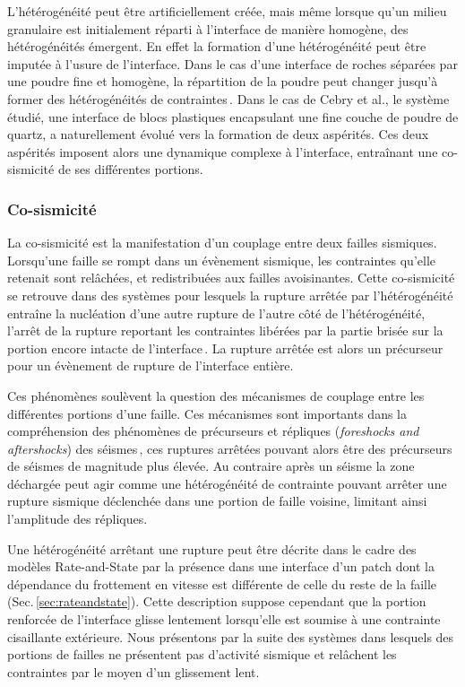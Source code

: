 L'hétérogénéité peut être artificiellement créée, mais même lorsque qu'un milieu granulaire est initialement réparti à l'interface de manière homogène, des hétérogénéités émergent. En effet la formation d'une hétérogénéité peut être imputée à l'usure 
de l'interface. Dans le cas d'une interface de roches séparées par une poudre fine et homogène, la répartition de la poudre peut changer jusqu'à former des hétérogénéités de contraintes\,\cite{cebry_creep_2022, buijze_nucleation_2020,gvirtzman_nucleation_2021}. Dans le cas de Cebry et al., le système étudié, une interface de blocs plastiques encapsulant une fine couche de poudre de quartz, a naturellement évolué vers la formation de deux aspérités. Ces deux aspérités imposent alors une dynamique complexe à l'interface, entraînant une co-sismicité de ses différentes portions.

\subsubsection{Co-sismicité}
La co-sismicité est la manifestation d'un couplage entre deux failles sismiques. Lorsqu'une faille se rompt dans un évènement sismique, les contraintes qu'elle retenait sont relâchées, et redistribuées aux failles avoisinantes. Cette co-sismicité se retrouve dans des systèmes pour lesquels la rupture arrêtée par l'hétérogénéité entraîne la nucléation d'une autre rupture de l'autre côté de l'hétérogénéité, l'arrêt de la rupture reportant les contraintes libérées par la partie brisée sur la portion encore intacte de l'interface\,\cite{rubino_intermittent_2022}. La rupture arrêtée est alors un précurseur pour un évènement de rupture de l’interface entière.

Ces phénomènes soulèvent la question des mécanismes de couplage entre les différentes portions d'une faille. Ces mécanismes sont importants dans la compréhension des phénomènes de précurseurs et répliques (\textit{foreshocks and aftershocks}) des séismes\,\cite{felzer_common_2004}, ces ruptures arrêtées pouvant alors être des précurseurs de séismes de magnitude plus élevée. Au contraire après un séisme la zone déchargée peut agir comme une hétérogénéité de contrainte pouvant arrêter une rupture sismique déclenchée dans une portion de faille voisine, limitant ainsi l'amplitude des répliques.


Une hétérogénéité arrêtant une rupture peut être décrite dans le cadre des modèles Rate-and-State par la présence dans une interface d'un patch dont la dépendance du frottement en vitesse est différente de celle du reste de la faille\,\cite{chen_scaling_2009,schwartz_slow_2007,noda_stable_2013} (Sec.\,\ref{sec:rateandstate}). Cette description suppose cependant que la portion renforcée de l'interface glisse lentement lorsqu'elle est soumise à une contrainte cisaillante extérieure. Nous présentons par la suite des systèmes dans lesquels des portions de failles ne présentent pas d'activité sismique et relâchent les contraintes par le moyen d'un glissement lent.



